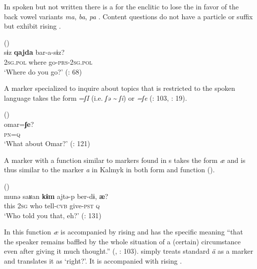 In spoken but not written  there is a  for the enclitic to lose the  in favor of the back vowel variants \textit{ma}, \textit{ba}, \textit{pa} \citep[17]{Muhamedowa2016}. Content questions do not have a particle or suffix but exhibit rising  \citep[20]{Muhamedowa2016}.

\ea%
    \label{ex:turk:15}
     ()\\
    \gll sɨz \textbf{{qajda}} bar-a-sɨz?\\
    2\textsc{sg.pol}  where  go-\textsc{prs}-2\textsc{sg.pol}\\
    \glt ‘Where do you go?’ (\citealt{GengShiminLiZengxiang1985}: 68)
    \z

A marker specialized to inquire about topics that is restricted to the spoken language takes the form =\textit{ʃI} (i.e. \textit{ʃə {\textasciitilde} ʃi}) or \textit{=ʃe} (\citealt{ZhangDingjing1991}: 103, \citealt{Muhamedowa2016}: 19).

\ea%
    \label{ex:turk:16}
     ()\\
    \gll omar=\textbf{{ʃe}}?\\
    \textsc{pn=q}\\
    \glt ‘What about Omar?’ (\citealt{GengShiminLiZengxiang1985}: 121)
    \z

A marker with a function similar to  markers found in s takes the form \textit{æ} and is thus similar to the marker \textit{a} in Kalmyk in both form and function ().

\ea%
    \label{ex:turk:17}
     ()\\
    \gll munə  saʁan \textbf{{kɨm}} ajtə-p    ber-dɨ, \textbf{{æ}}?\\
    this  2\textsc{sg}  who  tell-\textsc{cvb}  give-\textsc{pst}  \textsc{q}\\
    \glt ‘Who told you that, eh?’ (\citealt{GengShiminLiZengxiang1985}: 131)
    \z

\noindent In this function \textit{æ} is accompanied by rising  and has the specific meaning “that the speaker remains baffled by the whole situation of a (certain) circumstance even after giving it much thought.” (, \citealt{ZhangDingjing1991}: 103). \cite[19]{Muhamedowa2016} simply treats standard  \textit{ä} as a  marker and translates it as ‘right?’. It is accompanied with rising .

